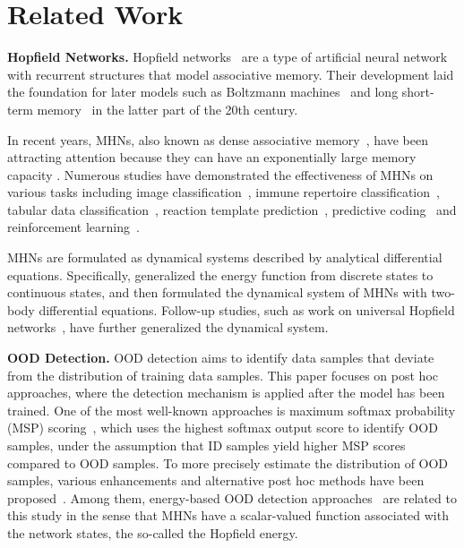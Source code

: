 \section{Related Work}

\noindent
\textbf{Hopfield Networks.}
Hopfield networks~\cite{hopfield82, hopfield88} are a type of artificial neural network with recurrent structures that model associative memory.
Their development laid the foundation for later models such as Boltzmann machines~\cite{Ackley1985boltzmannmachines} and long short-term memory~\cite{lstm} in the latter part of the 20th century.

In recent years, MHNs, also known as dense associative memory~\cite{krotov16dense}, have been attracting attention because they can have an exponentially large memory capacity \cite{demircigil17hugecapacity}.
Numerous studies have demonstrated the effectiveness of MHNs on various tasks including image classification~\cite{furst2021cloob, ota2023learning}, immune repertoire classification~\cite{widrich20modern},
tabular data classification~\cite{schafl2021hopular},
reaction template prediction~\cite{seidl2022improving},
predictive coding~\cite{NEURIPS2021_1fb36c4c} and reinforcement learning~\cite{widrich2021modern}.

MHNs are formulated as dynamical systems described by analytical differential equations.
Specifically, \citet{ramsauer21hopfieldallyouneed} generalized the energy function from discrete states to continuous states, and then \citet{krotov2021large} formulated the dynamical system of MHNs with two-body differential equations.
Follow-up studies, such as work on universal Hopfield networks~\cite{millidge2022universal}, have further generalized the dynamical system.

\noindent \textbf{OOD Detection.}
OOD detection aims to identify data samples that deviate from the distribution of training data samples.
This paper focuses on post hoc approaches, where the detection mechanism is applied after the model has been trained.
One of the most well-known approaches is maximum softmax probability (MSP) scoring~\cite{hendrycks2017msp}, which uses the highest softmax output score to identify OOD samples, under the assumption that ID samples yield higher MSP scores compared to OOD samples.
To more precisely estimate the distribution of OOD samples, various enhancements and alternative post hoc methods have been proposed~\cite{liang2018odin,liu2020energy,sun2021react,sun2022dice,shen2023posthoc,chen2024tagfog}.
Among them, energy-based OOD detection approaches~\cite{liu2020energy, sun2021react} are related to this study in the sense that MHNs have a scalar-valued function associated with the network states, the so-called the Hopfield energy.

